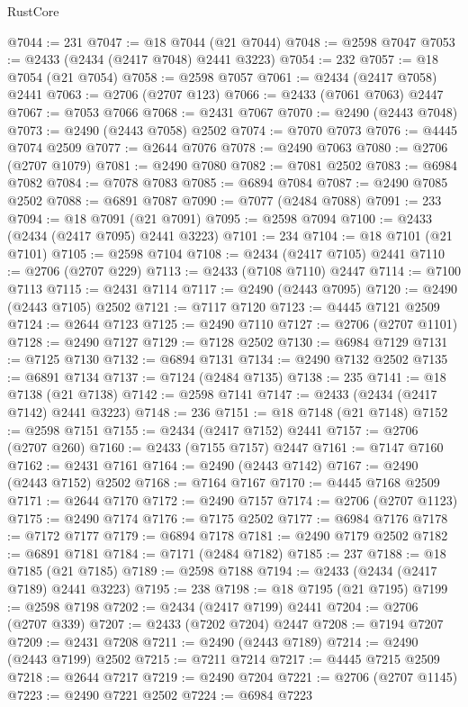 \begin{lexlean}{RustCore}
\begin{coremodule}
@7044 := 231
@7047 := @18 @7044 (@21 @7044)
@7048 := @2598 @7047
@7053 := @2433 (@2434 (@2417 @7048) @2441 @3223)
@7054 := 232
@7057 := @18 @7054 (@21 @7054)
@7058 := @2598 @7057
@7061 := @2434 (@2417 @7058) @2441
@7063 := @2706 (@2707 @123)
@7066 := @2433 (@7061 @7063) @2447
@7067 := @7053 @7066
@7068 := @2431 @7067
@7070 := @2490 (@2443 @7048)
@7073 := @2490 (@2443 @7058) @2502
@7074 := @7070 @7073
@7076 := @4445 @7074 @2509
@7077 := @2644 @7076
@7078 := @2490 @7063
@7080 := @2706 (@2707 @1079)
@7081 := @2490 @7080
@7082 := @7081 @2502
@7083 := @6984 @7082
@7084 := @7078 @7083
@7085 := @6894 @7084
@7087 := @2490 @7085 @2502
@7088 := @6891 @7087
@7090 := @7077 (@2484 @7088)
@7091 := 233
@7094 := @18 @7091 (@21 @7091)
@7095 := @2598 @7094
@7100 := @2433 (@2434 (@2417 @7095) @2441 @3223)
@7101 := 234
@7104 := @18 @7101 (@21 @7101)
@7105 := @2598 @7104
@7108 := @2434 (@2417 @7105) @2441
@7110 := @2706 (@2707 @229)
@7113 := @2433 (@7108 @7110) @2447
@7114 := @7100 @7113
@7115 := @2431 @7114
@7117 := @2490 (@2443 @7095)
@7120 := @2490 (@2443 @7105) @2502
@7121 := @7117 @7120
@7123 := @4445 @7121 @2509
@7124 := @2644 @7123
@7125 := @2490 @7110
@7127 := @2706 (@2707 @1101)
@7128 := @2490 @7127
@7129 := @7128 @2502
@7130 := @6984 @7129
@7131 := @7125 @7130
@7132 := @6894 @7131
@7134 := @2490 @7132 @2502
@7135 := @6891 @7134
@7137 := @7124 (@2484 @7135)
@7138 := 235
@7141 := @18 @7138 (@21 @7138)
@7142 := @2598 @7141
@7147 := @2433 (@2434 (@2417 @7142) @2441 @3223)
@7148 := 236
@7151 := @18 @7148 (@21 @7148)
@7152 := @2598 @7151
@7155 := @2434 (@2417 @7152) @2441
@7157 := @2706 (@2707 @260)
@7160 := @2433 (@7155 @7157) @2447
@7161 := @7147 @7160
@7162 := @2431 @7161
@7164 := @2490 (@2443 @7142)
@7167 := @2490 (@2443 @7152) @2502
@7168 := @7164 @7167
@7170 := @4445 @7168 @2509
@7171 := @2644 @7170
@7172 := @2490 @7157
@7174 := @2706 (@2707 @1123)
@7175 := @2490 @7174
@7176 := @7175 @2502
@7177 := @6984 @7176
@7178 := @7172 @7177
@7179 := @6894 @7178
@7181 := @2490 @7179 @2502
@7182 := @6891 @7181
@7184 := @7171 (@2484 @7182)
@7185 := 237
@7188 := @18 @7185 (@21 @7185)
@7189 := @2598 @7188
@7194 := @2433 (@2434 (@2417 @7189) @2441 @3223)
@7195 := 238
@7198 := @18 @7195 (@21 @7195)
@7199 := @2598 @7198
@7202 := @2434 (@2417 @7199) @2441
@7204 := @2706 (@2707 @339)
@7207 := @2433 (@7202 @7204) @2447
@7208 := @7194 @7207
@7209 := @2431 @7208
@7211 := @2490 (@2443 @7189)
@7214 := @2490 (@2443 @7199) @2502
@7215 := @7211 @7214
@7217 := @4445 @7215 @2509
@7218 := @2644 @7217
@7219 := @2490 @7204
@7221 := @2706 (@2707 @1145)
@7223 := @2490 @7221 @2502
@7224 := @6984 @7223

\end{coremodule}
\end{lexlean}
